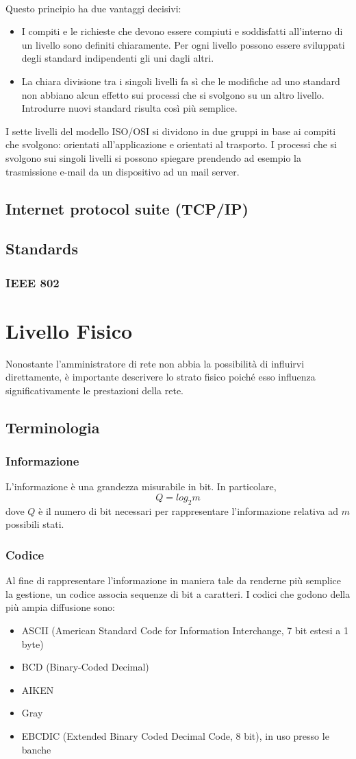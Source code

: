 \documentclass[a4paper,11pt]{article}
\def\sec#1{\section{#1}\label{#1}}
\def\sub#1{\subsection{#1}\label{#1}}
\def\subsub#1{\subsubsection{#1}\label{#1}}
\begin{document}
\\Questo principio ha due vantaggi decisivi:
\begin{itemize}
	\item I compiti e le richieste che devono essere compiuti e soddisfatti all’interno di un livello sono definiti chiaramente. Per ogni livello possono essere sviluppati degli standard indipendenti gli uni dagli altri.
	\item La chiara divisione tra i singoli livelli fa sì che le modifiche ad uno standard non abbiano alcun effetto sui processi che si svolgono su un altro livello. Introdurre nuovi standard risulta così più semplice.
\end{itemize}
I sette livelli del modello ISO/OSI si dividono in due gruppi in base ai compiti che svolgono: orientati all’applicazione e orientati al trasporto. I processi che si svolgono sui singoli livelli si possono spiegare prendendo ad esempio la trasmissione e-mail da un dispositivo ad un mail server.

\sub{Internet protocol suite (TCP/IP)}
\sub{Standards}
\subsub{IEEE 802}
\newpage

\sec{Livello Fisico}
Nonostante l'amministratore di rete non abbia la possibilità di influirvi direttamente, è importante descrivere lo strato fisico poiché esso influenza significativamente le prestazioni della rete.

\subsection{Terminologia}
\subsub{Informazione} 
L'informazione è una grandezza misurabile in bit. In particolare, \[Q=log_{2}m\] dove $Q$ è il numero di bit necessari per rappresentare l'informazione relativa ad $m$ possibili stati.

\subsub{Codice}
Al fine di rappresentare l'informazione in maniera tale da renderne più semplice la gestione, un codice associa sequenze di bit a caratteri. I codici che godono della più ampia diffusione sono:
\begin{itemize}
\item ASCII (American Standard Code for Information Interchange, 7 bit estesi a 1 byte)
\item BCD (Binary-Coded Decimal)
\item AIKEN 
\item Gray
\item EBCDIC (Extended Binary Coded Decimal Code, 8 bit), in uso presso le banche
\end{itemize}
\end{document}
